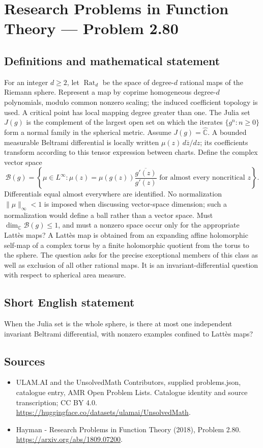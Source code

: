 \documentclass[11pt,a4paper]{article}
\begin{document}
\section*{Research Problems in Function Theory — Problem 2.80}\label{statement}

\subsection{Definitions and mathematical statement}
For an integer $d\ge2$, let $\operatorname{Rat}_d$ be the space of degree-$d$ rational maps of the Riemann sphere. Represent a map by coprime homogeneous degree-$d$ polynomials, modulo common nonzero scaling; the induced coefficient topology is used. A critical point has local mapping degree greater than one. The Julia set $J(g)$ is the complement of the largest open set on which the iterates $\{g^n:n\ge0\}$ form a normal family in the spherical metric.
Assume $J(g)=\widehat{\mathbb C}$. A bounded measurable Beltrami differential is locally written $\mu(z)\,d\overline z/dz$; its coefficients transform according to this tensor expression between charts. Define the complex vector space
\[
\mathcal B(g)=\left\{\mu\in L^\infty:
\mu(z)=\mu(g(z))\frac{\overline{g'(z)}}{g'(z)}
\text{ for almost every noncritical }z\right\}.
\]
Differentials equal almost everywhere are identified. No normalization $\|\mu\|_\infty<1$ is imposed when discussing vector-space dimension; such a normalization would define a ball rather than a vector space.
Must $\dim_{\mathbb C}\mathcal B(g)\le1$, and must a nonzero space occur only for the appropriate Latt\`es maps? A Latt\`es map is obtained from an expanding affine holomorphic self-map of a complex torus by a finite holomorphic quotient from the torus to the sphere. The question asks for the precise exceptional members of this class as well as exclusion of all other rational maps. It is an invariant-differential question with respect to spherical area measure.
\subsection{Short English statement}
When the Julia set is the whole sphere, is there at most one independent invariant Beltrami differential, with nonzero examples confined to Lattès maps?
\subsection{Sources}
\begin{itemize}
\item[S1] ULAM.AI and the UnsolvedMath Contributors, supplied problems.json, catalogue entry, AMR Open Problem Lists. Catalogue identity and source transcription; CC BY 4.0.
\url{https://huggingface.co/datasets/ulamai/UnsolvedMath}.
\item[S2] Hayman - Research Problems in Function Theory (2018), Problem 2.80. 
\url{https://arxiv.org/abs/1809.07200}.
\end{itemize}
\end{document}
